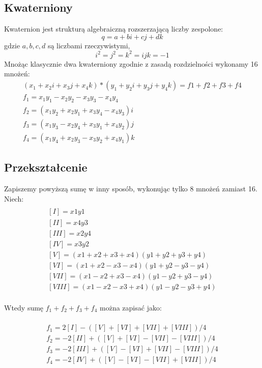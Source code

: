 \documentclass[paper=a4, fontsize=11pt]{scrartcl} %
\numberwithin{equation}{section} %
\numberwithin{figure}{section} %
\numberwithin{table}{section} %
\begin{document}
\subsection{Kwaterniony}
Kwaternion jest strukturą algebraiczną rozszerzającą liczby zespolone:
\[q = a + bi + cj + dk \]
gdzie ${a,b,c,d}$ są liczbami rzeczywistymi,
 \[i^{2}=j^{2}=k^{2}=ijk=-1 \]
Mnożąc klasycznie dwa kwaterniony zgodnie z zasadą rozdzielności wykonamy 16 mnożeń:\medbreak
\begin{equation}
	\begin{gathered}
	(x_1 + x_2 i + x_3 j + x_4 k ) * (y_1 + y_2 i + y_3 j + y_4 k) = f1 + f2 + f3 + f4 \\
	f_1 = x_1 y_1 - x_2 y_2 - x_3 y_3 - x_4 y_4 \\
	f_2 = (x_1 y_2 + x_2 y_1 + x_3 y_4 - x_4 y_3 ) i \\
	f_3 = ( x_1 y_3 - x_2 y_4 + x_3 y_1 + x_4 y_2 ) j \\
	f_4 = ( x_1 y_4 + x_2 y_3 - x_3 y_2 + x_4 y_1 ) k	
	\end{gathered}
\end{equation}

\subsection{Przekształcenie}
Zapiszemy powyższą sumę w inny sposób, wykonując tylko 8 mnożeń zamiast 16. Niech:
\begin{equation}
\begin{gathered}
\\
[I] = x1 y1 \\ 
[II] = x4 y3 \\ 
[III] = x2 y4 \\
[IV] = x3 y2 \\
[V] = (x1+x2+x3+x4)(y1+y2+y3+y4) \\
[VI] = (x1+x2-x3-x4)(y1+y2-y3-y4) \\
[VII] = (x1-x2+x3-x4)(y1-y2+y3-y4) \\
[VIII] = (x1-x2-x3+x4)(y1-y2-y3+y4) \\
\end{gathered}
\end{equation}

Wtedy sumę ${f_1+f_2+f_3+f_4}$ można zapisać jako:

\begin{equation}
\begin{gathered}
\\
f_1 = 2[I] - ([V] + [VI] + [VII] + [VIII])/4 \\ 
f_2 = -2[II] + ([V] + [VI] - [VII] - [VIII])/4 \\ 
f_3 = -2[III] + ([V] - [VI] + [VII] - [VIII])/4 \\
f_4 = -2[IV] + ([V] - [VI] - [VII] + [VIII])/4 \\
\end{gathered}
\end{equation}
\end{document}
